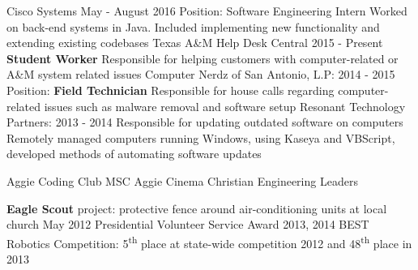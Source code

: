 \documentclass[12pt]{article}
\begin{document}
\begin{flushleft}
\begin{outline}[compactitem]
  \1 Cisco Systems \hfill May - August 2016
    \2 Position: Software Engineering Intern
    \2 Worked on back-end systems in Java. Included implementing new functionality and extending existing codebases
  \1 Texas A\&M Help Desk Central \hfill 2015 - Present
    \2 \textbf{Student Worker}
    \2 Responsible for helping customers with computer-related or A\&M system related issues
  \1 Computer Nerdz of San Antonio, L.P: \hfill 2014 - 2015
    \2 Position: \textbf{Field Technician}
    \2 Responsible for house calls regarding computer-related issues such as malware removal and software setup
  \1 Resonant Technology Partners: \hfill 2013 - 2014
    \2 Responsible for updating outdated software on computers
    \2 Remotely managed computers running Windows, using Kaseya and VBScript, developed methods of automating software updates

  \1 Aggie Coding Club \hfill{}\hspace{1px} MSC Aggie Cinema \hfill{}\hspace{1px} Christian Engineering Leaders

  \1 \textbf{Eagle Scout} project: protective fence around air-conditioning units at local church \hfill May 2012
  \1 Presidential Volunteer Service Award \hfill 2013, 2014
  \1 BEST Robotics Competition: 5\textsuperscript{th} place at state-wide competition 2012 and 48\textsuperscript{th} place in 2013

\end{outline}
\end{flushleft}
\end{document}
